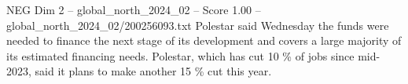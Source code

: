 \begin{textsample}{NEG Dim 2 – global\_north\_2024\_02 – Score 1.00 – global\_north\_2024\_02/200256093.txt}
Polestar said Wednesday the funds were needed to finance the next stage of its development and covers a large majority of its estimated financing needs.
Polestar, which has cut 10 \% of jobs since mid-2023, said it plans to make another 15 \% cut this year.

\end{textsample}

